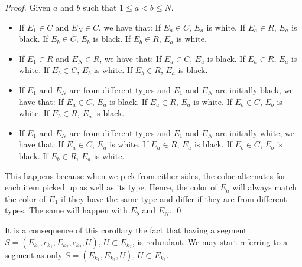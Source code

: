\begin{proof}
Given $a$ and $b$ such that $1 \leq a < b \leq N$.

\begin{itemize}
\item If $E_{1} \in C$ and $E_{N} \in C$, we have that: If $E_{a} \in C$, $E_{a}$ is white. If $E_{a} \in R$, $E_{a}$ is black. If $E_{b} \in C$, $E_{b}$ is black. If $E_{b} \in R$, $E_{a}$ is white.

\item If $E_{1} \in R$ and $E_{N} \in R$, we have that: If $E_{a} \in C$, $E_{a}$ is black. If $E_{a} \in R$, $E_{a}$ is white. If $E_{b} \in C$, $E_{b}$ is white. If $E_{b} \in R$, $E_{a}$ is black.

\item If $E_{1}$ and $E_{N}$ are from different types and $E_{1}$ and $E_{N}$ are initially black, we have that: If $E_{a} \in C$, $E_{a}$ is black. If $E_{a} \in R$, $E_{a}$ is white. If $E_{b} \in C$, $E_{b}$ is white. If $E_{b} \in R$, $E_{a}$ is black.

\item If $E_{1}$ and $E_{N}$ are from different types and $E_{1}$ and $E_{N}$ are initially white, we have that: If $E_{a} \in C$, $E_{a}$ is white. If $E_{a} \in R$, $E_{a}$ is black. If $E_{b} \in C$, $E_{b}$ is black. If $E_{b} \in R$, $E_{a}$ is white.
\end{itemize}

This happens because when we pick from either sides, the color alternates for each item picked up as well as its type. Hence, the color of $E_{a}$ will always match the color of $E_{1}$ if they have the same type and differ if they are from different types.
The same will happen with $E_{b}$ and $E_{N}$.
\qed
\end{proof}

It is a consequence of this corollary the fact that having a segment $S=(E_{k_{1}},c_{k_{1}},E_{k_{2}},c_{k_{2}},U)$, $U \subset E_{k_{2}}$, is redundant. We may start referring to a segment as only $S=(E_{k_{1}},E_{k_{2}},U)$, $U \subset E_{k_{2}}$.

